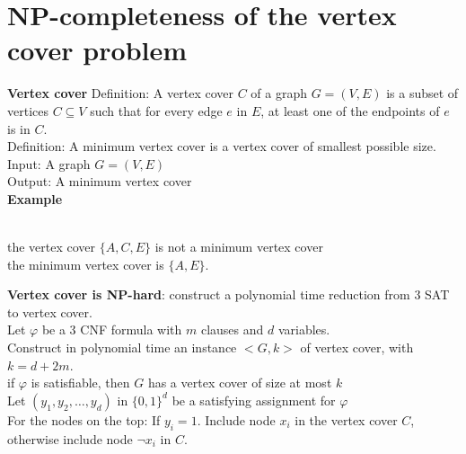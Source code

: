\documentclass[onecolumn]{report}
\begin{document}
\section{NP-completeness of the vertex cover problem}
\textbf{Vertex cover}
Definition: A vertex cover $C$ of a graph $G = (V, E)$ is a subset of vertices $C \subseteq V$ such that for every edge $e$ in $E$, at least one of the endpoints of $e$ is in $C$.\\
Definition: A minimum vertex cover is a vertex cover of smallest possible size.\\
Input: A graph $G = (V, E)$\\
Output: A minimum vertex cover\\
\textbf{Example}
\begin{center}
    \\
    the vertex cover $\{A, C, E\}$ is not a minimum vertex cover\\
    the minimum vertex cover is $\{A, E\}$.
\end{center}
\textbf{Vertex cover is NP-hard}: construct a polynomial time reduction from 3 SAT to vertex cover.\\
\indent Let $\varphi$ be a 3 CNF formula with $m$ clauses and $d$ variables.\\
\indent Construct in polynomial time an instance $<G, k>$ of vertex cover, with $k = d + 2m$.\\
\indent \indent if $\varphi$ is satisfiable, then $G$ has a vertex cover of size at most $k$\\
\indent \indent \indent Let $(y_1, y_2, \dots, y_d)$ in $\{0, 1\}^d$ be a satisfying assignment for $\varphi$\\
\indent \indent \indent For the nodes on the top: If $y_i = 1$. Include node $x_i$ in the vertex cover $C$, otherwise include node $\lnot x_i$ in $C$.\\
\end{document}
